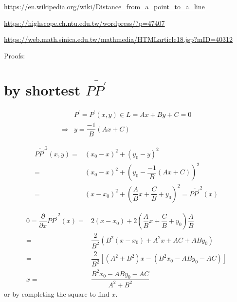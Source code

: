 \documentclass[
]{book}
\theoremstyle{definition}
\theoremstyle{definition}
\theoremstyle{definition}
\theoremstyle{definition}
\theoremstyle{remark}
\begin{document}
\url{https://en.wikipedia.org/wiki/Distance_from_a_point_to_a_line}

\url{https://highscope.ch.ntu.edu.tw/wordpress/?p=47407}

\url{https://web.math.sinica.edu.tw/mathmedia/HTMLarticle18.jsp?mID=40312}

Proofs:

\hypertarget{by-shortest-overlineppprime}{%
\section{\texorpdfstring{by shortest \(\overline{PP^{\prime}}\)}{by shortest \textbackslash overline\{PP\^{}\{\textbackslash prime\}\}}}\label{by-shortest-overlineppprime}}

\[
\begin{aligned}
 & P^{\prime}=P^{\prime}\left(x,y\right)\in L=Ax+By+C=0\\
\Rightarrow & y=\dfrac{-1}{B}\left(Ax+C\right)
\end{aligned}
\]

\[
\begin{aligned}
\overline{PP^{\prime}}^{2}\left(x,y\right)= & \left(x_{0}-x\right)^{2}+\left(y_{0}-y\right)^{2}\\
= & \left(x_{0}-x\right)^{2}+\left(y_{0}-\dfrac{-1}{B}\left(Ax+C\right)\right)^{2}\\
= & \left(x-x_{0}\right)^{2}+\left(\dfrac{A}{B}x+\dfrac{C}{B}+y_{0}\right)^{2}=\overline{PP^{\prime}}^{2}\left(x\right)
\end{aligned}
\]

\[
\begin{aligned}
0=\dfrac{\partial}{\partial x}\overline{PP^{\prime}}^{2}\left(x\right)= & 2\left(x-x_{0}\right)+2\left(\dfrac{A}{B}x+\dfrac{C}{B}+y_{0}\right)\dfrac{A}{B}\\
= & \dfrac{2}{B^{2}}\left(B^{2}\left(x-x_{0}\right)+A^{2}x+AC+ABy_{0}\right)\\
= & \dfrac{2}{B^{2}}\left[\left(A^{2}+B^{2}\right)x-\left(B^{2}x_{0}-ABy_{0}-AC\right)\right]\\
x= & \dfrac{B^{2}x_{0}-ABy_{0}-AC}{A^{2}+B^{2}}
\end{aligned}
\]
or by completing the square to find \(x\).
\end{document}
